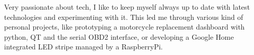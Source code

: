 
\begin{cventries}
  \cventry
    {}
    {}
    {}
    {}
    {Very passionate about tech, I like to keep myself always up to date with latest technologies and experimenting with it. This led me through various kind of personal projects, like prototyping a motorcycle replacement dashboard with python, QT and the serial OBD2 interface, or developing a Google Home integrated LED stripe managed by a RaspberryPi.}

\end{cventries}